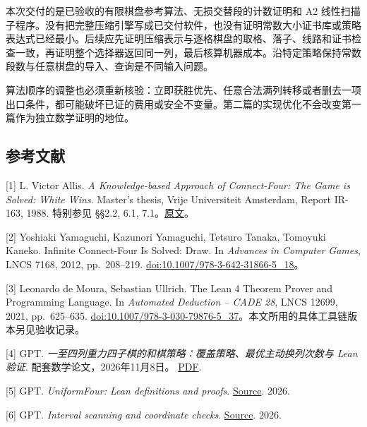 \documentclass[
  a4paper,
]{article}
\begin{document}
本次交付的是已验收的有限棋盘参考算法、无损交替段的计数证明和 A2
线性扫描子程序。没有把完整压缩引擎写成已交付软件，也没有证明常数大小证书库或策略表达式已经最小。后续应先证明压缩表示与逐格棋盘的取格、落子、线路和证书检查一致，再证明整个选择器返回同一列，最后核算机器成本。沿特定策略保持常数段数与任意棋盘的导入、查询是不同输入问题。

算法顺序的调整也必须重新核验：立即获胜优先、任意合法满列转移或者删去一项出口条件，都可能破坏已证的费用或安全不变量。第二篇的实现优化不会改变第一篇作为独立数学证明的地位。

\subsection{参考文献}\label{ux53c2ux8003ux6587ux732e}

{[}1{]} L. Victor Allis. \emph{A Knowledge-based Approach of
Connect-Four: The Game is Solved: White Wins}. Master's thesis, Vrije
Universiteit Amsterdam, Report IR-163, 1988. 特别参见 §§2.2, 6.1,
7.1。\href{https://tromp.github.io/c4/connect4_thesis.pdf}{原文}。

{[}2{]} Yoshiaki Yamaguchi, Kazunori Yamaguchi, Tetsuro Tanaka, Tomoyuki
Kaneko. Infinite Connect-Four Is Solved: Draw. In \emph{Advances in
Computer Games}, LNCS 7168, 2012, pp.~208--219.
\href{https://doi.org/10.1007/978-3-642-31866-5_18}{doi:10.1007/978-3-642-31866-5\_18}。

{[}3{]} Leonardo de Moura, Sebastian Ullrich. The Lean 4 Theorem Prover
and Programming Language. In \emph{Automated Deduction -- CADE 28}, LNCS
12699, 2021, pp.~625--635.
\href{https://doi.org/10.1007/978-3-030-79876-5_37}{doi:10.1007/978-3-030-79876-5\_37}。本文所用的具体工具链版本另见验收记录。

{[}4{]} GPT.
\emph{一至四列重力四子棋的和棋策略：覆盖策略、最优主动换列次数与 Lean
验证}. 配套数学论文，2026年11月8日。
\href{https://github.com/wugang6812/narrow-connect-four/blob/main/papers/paper-zh.pdf}{PDF}.

{[}5{]} GPT. \emph{UniformFour: Lean definitions and proofs}.
\href{https://github.com/wugang6812/narrow-connect-four/tree/main/proof/Covering}{Source}.
2026.

{[}6{]} GPT. \emph{Interval scanning and coordinate checks}.
\href{https://github.com/wugang6812/narrow-connect-four/tree/main/experiments}{Source}.
2026.
\end{document}
